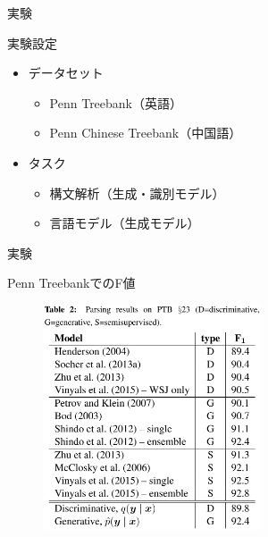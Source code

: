 \documentclass[aspectratio=43,unicode,10pt]{beamer}
\begin{document}
\begin{frame}{実験}
  \begin{block}{実験設定}
    \begin{itemize}
      \item データセット
        \begin{itemize}
          \item Penn Treebank（英語）
          \item Penn Chinese Treebank（中国語）
        \end{itemize}
      \item タスク
        \begin{itemize}
          \item 構文解析（生成・識別モデル）
          \item 言語モデル（生成モデル）
        \end{itemize}
    \end{itemize}
  \end{block}
\end{frame}

\begin{frame}{実験}
  \begin{block}{Penn TreebankでのF値}
    \begin{figure}
      \includegraphics[width=0.575\textwidth]{fig/tab_2.png}
    \end{figure}
  \end{block}
\end{frame}
\end{document}
